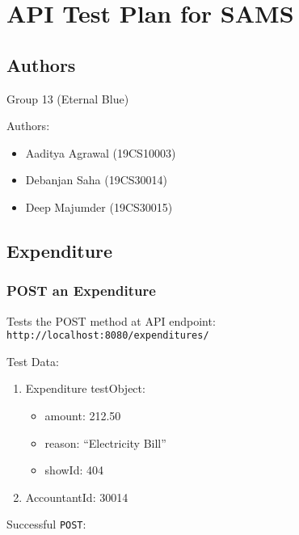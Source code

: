 \documentclass[]{article}
\date{}
\providecommand{\tightlist}{%
  \setlength{\itemsep}{0pt}\setlength{\parskip}{0pt}}
\begin{document}
\hypertarget{api-test-plan-for-sams}{%
\section{API Test Plan for SAMS}\label{api-test-plan-for-sams}}

\hypertarget{authors}{%
\subsection{Authors}\label{authors}}

Group 13 (Eternal Blue)

Authors:

\begin{itemize}
\tightlist
\item
  Aaditya Agrawal (19CS10003)
\item
  Debanjan Saha (19CS30014)
\item
  Deep Majumder (19CS30015)
\end{itemize}

\hypertarget{expenditure}{%
\subsection{Expenditure}\label{expenditure}}

\hypertarget{post-an-expenditure}{%
\subsubsection{POST an Expenditure}\label{post-an-expenditure}}

Tests the POST method at API endpoint:
\texttt{http://localhost:8080/expenditures/}

Test Data:

\begin{enumerate}
\def\labelenumi{\arabic{enumi}.}
\tightlist
\item
  Expenditure testObject:

  \begin{itemize}
  \tightlist
  \item
    amount: 212.50
  \item
    reason: ``Electricity Bill''
  \item
    showId: 404
  \end{itemize}
\item
  AccountantId: 30014
\end{enumerate}

Successful \texttt{POST}:
\end{document}

